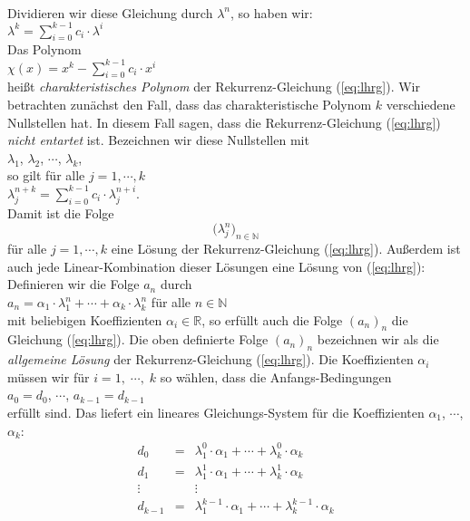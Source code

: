 \\[0.2cm]
Dividieren wir diese Gleichung durch $\lambda^n$, so haben wir: \\[0.2cm]
\hspace*{1.3cm} $\lambda^{k} = \sum\limits_{i=0}^{k-1} c_i \cdot \lambda^{i}$  
\\[0.2cm]
Das Polynom \\[0.2cm]
\hspace*{1.3cm} 
$\chi(x) = x^{k} - \sum\limits_{i=0}^{k-1} c_i \cdot x^{i}$  
\\[0.2cm]
 heißt \emph{charakteristisches Polynom} der Rekurrenz-Gleichung (\ref{eq:lhrg}).
Wir betrachten zunächst den Fall, dass das charakteristische  Polynom  $k$  verschiedene
Nullstellen hat.  In diesem Fall sagen, dass die Rekurrenz-Gleichung (\ref{eq:lhrg}) 
\emph{nicht entartet} ist.
Bezeichnen wir diese Nullstellen mit \\[0.2cm]
\hspace*{1.3cm}  $\lambda_1$, $\lambda_2$, $\cdots$, $\lambda_k$, \\[0.2cm]
so  gilt für alle $j = 1,\cdots, k$ \\[0.2cm]
\hspace*{1.3cm} 
$\lambda_j^{n+k} = \sum\limits_{i=0}^{k-1} c_i \cdot \lambda_j^{n+i}$.
\\[0.2cm]
Damit ist die Folge  
\[\bigl(\lambda_j^n)_{n\in\mathbb{N}}\]
für alle $j=1,\cdots,k$ eine Lösung der Rekurrenz-Gleichung (\ref{eq:lhrg}).
Außerdem ist auch jede Linear-Kombination dieser Lösungen eine Lösung von (\ref{eq:lhrg}):
Definieren wir die Folge $a_n$ durch \\[0.2cm]
\hspace*{1.3cm} 
$a_n = \alpha_1 \cdot \lambda_1^n + \cdots + \alpha_k \cdot \lambda_k^n$ \quad für alle $n
\in \mathbb{N}$ 
\\[0.2cm]
mit beliebigen Koeffizienten $\alpha_i \in \mathbb{R}$, so erfüllt auch die Folge
$(a_n)_n$ die Gleichung (\ref{eq:lhrg}).  Die oben definierte Folge $(a_n)_n$ bezeichnen wir als
die  \emph{allgemeine Lösung} der Rekurrenz-Gleichung (\ref{eq:lhrg}). 
Die Koeffizienten $\alpha_i$ müssen wir für $i=1,\;\cdots,\;k$ so wählen, dass die
Anfangs-Bedingungen 
\\[0.2cm]
\hspace*{1.3cm}
$a_0 = d_0$, $\cdots$, $a_{k-1} = d_{k-1}$
\\[0.2cm]
erfüllt sind.  Das liefert ein lineares Gleichungs-System für die Koeffizienten $\alpha_1$, $\cdots$, $\alpha_k$:
\[
\begin{array}{lcl}
  d_0     & = & \lambda_1^0 \cdot \alpha_1 + \cdots +   \lambda_k^0 \cdot \alpha_k \\[0.2cm]
  d_1     & = & \lambda_1^1 \cdot \alpha_1 + \cdots +   \lambda_k^1 \cdot \alpha_k \\[0.2cm]
  \vdots  &   & \vdots                                                   \\[0.2cm]
  d_{k-1} & = & \lambda_1^{k-1} \cdot \alpha_1 + \cdots +   \lambda_{k}^{k-1} \cdot \alpha_k \\[0.2cm]
\end{array}
\]
